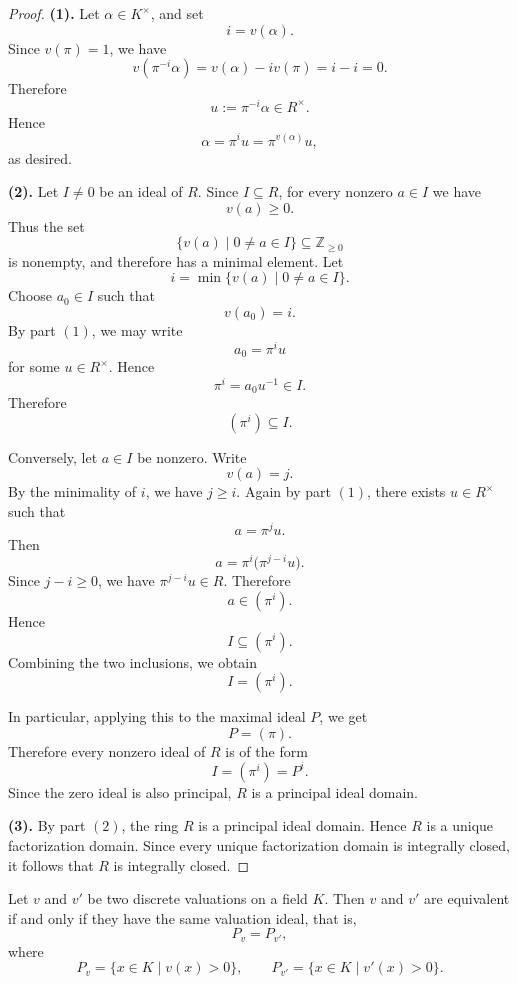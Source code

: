 \begin{proof}
    \textbf{(1).}
    Let \(\alpha\in K^\times\), and set
    \[
        i=v(\alpha).
    \]
    Since \(v(\pi)=1\), we have
    \[
        v(\pi^{-i}\alpha)
        =
        v(\alpha)-i v(\pi)
        =
        i-i
        =
        0.
    \]
    Therefore
    \[
        u:=\pi^{-i}\alpha\in R^\times.
    \]
    Hence
    \[
        \alpha=\pi^i u=\pi^{v(\alpha)}u,
    \]
    as desired.

    \medskip

    \textbf{(2).}
    Let \(I\neq 0\) be an ideal of \(R\). Since \(I\subseteq R\), for every nonzero
    \(a\in I\) we have
    \[
        v(a)\geq 0.
    \]
    Thus the set
    \[
        \{v(a)\mid 0\neq a\in I\}\subseteq \mathbb{Z}_{\geq 0}
    \]
    is nonempty, and therefore has a minimal element. Let
    \[
        i=\min\{v(a)\mid 0\neq a\in I\}.
    \]
    Choose \(a_0\in I\) such that
    \[
        v(a_0)=i.
    \]
    By part \((1)\), we may write
    \[
        a_0=\pi^i u
    \]
    for some \(u\in R^\times\). Hence
    \[
        \pi^i=a_0u^{-1}\in I.
    \]
    Therefore
    \[
        (\pi^i)\subseteq I.
    \]

    Conversely, let \(a\in I\) be nonzero. Write
    \[
        v(a)=j.
    \]
    By the minimality of \(i\), we have \(j\geq i\). Again by part \((1)\), there exists
    \(u\in R^\times\) such that
    \[
        a=\pi^j u.
    \]
    Then
    \[
        a
        =
        \pi^i\bigl(\pi^{j-i}u\bigr).
    \]
    Since \(j-i\geq 0\), we have \(\pi^{j-i}u\in R\). Therefore
    \[
        a\in (\pi^i).
    \]
    Hence
    \[
        I\subseteq (\pi^i).
    \]
    Combining the two inclusions, we obtain
    \[
        I=(\pi^i).
    \]

    In particular, applying this to the maximal ideal \(P\), we get
    \[
        P=(\pi).
    \]
    Therefore every nonzero ideal of \(R\) is of the form
    \[
        I=(\pi^i)=P^i.
    \]
    Since the zero ideal is also principal, \(R\) is a principal ideal domain.

    \medskip

    \textbf{(3).}
    By part \((2)\), the ring \(R\) is a principal ideal domain. Hence \(R\) is a unique
    factorization domain. Since every unique factorization domain is integrally closed,
    it follows that \(R\) is integrally closed.
\end{proof}

\begin{corollary}
    Let \(v\) and \(v'\) be two discrete valuations on a field \(K\). Then \(v\)
    and \(v'\) are equivalent if and only if they have the same valuation ideal, that is,
    \[
        P_v=P_{v'},
    \]
    where
    \[
        P_v=\{x\in K\mid v(x)>0\},
        \qquad
        P_{v'}=\{x\in K\mid v'(x)>0\}.
    \]
\end{corollary}

